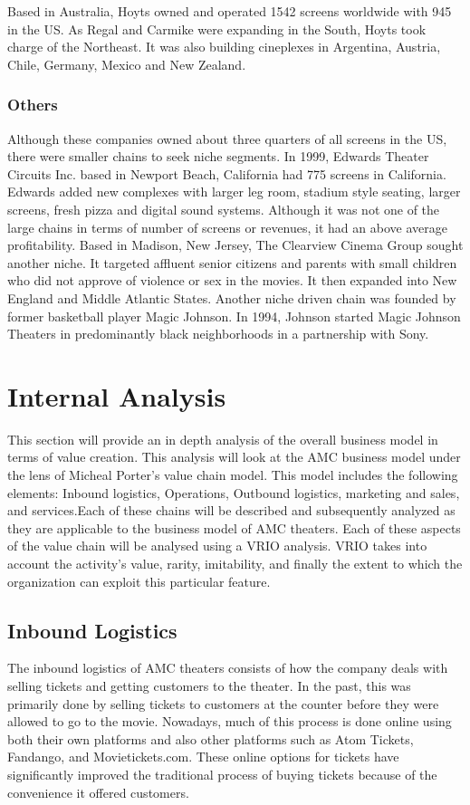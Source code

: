 \documentclass[12pt]{article}
\begin{document}
Based in Australia, Hoyts owned and operated 1542 screens worldwide with 945 in the US. As Regal and Carmike were expanding in the South, Hoyts took charge of the Northeast. It was also building cineplexes in Argentina, Austria, Chile, Germany, Mexico and New Zealand. 

\subsubsection{Others} 

Although these companies owned about three quarters of all screens in the US, there were smaller chains to seek niche segments. In 1999, Edwards Theater Circuits Inc. based in Newport Beach, California had 775 screens in California. Edwards added new complexes with larger leg room, stadium style seating, larger screens, fresh pizza and digital sound systems. Although it was not one of the large chains in terms of number of screens or revenues, it had an above average profitability. Based in Madison, New Jersey, The Clearview Cinema Group sought another niche. It targeted affluent senior citizens and parents with small children who did not approve of violence or sex in the movies. It then expanded into New England and Middle Atlantic States. Another niche driven chain was founded by former basketball player Magic Johnson. In 1994, Johnson started Magic Johnson Theaters in predominantly black neighborhoods in a partnership with Sony. 




\section{Internal Analysis}

This section will provide an in depth analysis of the overall business model in terms of value creation. This analysis will look at the AMC business model under the lens of Micheal Porter's value chain model. This model includes the following elements: Inbound logistics, Operations, Outbound logistics, marketing and sales, and services.Each of these chains will be described and subsequently analyzed as they are applicable to the business model of AMC theaters. Each of these aspects of the value chain will be analysed using a VRIO analysis. VRIO takes into account the activity's value, rarity, imitability, and finally the extent to which the organization can exploit this particular feature. 
\subsection{Inbound Logistics}
The inbound logistics of AMC theaters consists of how the company deals with selling tickets and getting customers to the theater. In the past, this was primarily done by selling tickets to customers at the counter before they were allowed to go to the movie. Nowadays, much of this process is done online using both their own platforms and also other platforms such as Atom Tickets, Fandango, and Movietickets.com. These online options for tickets have significantly improved the traditional process of buying tickets because of the convenience it offered customers. 
\end{document}
